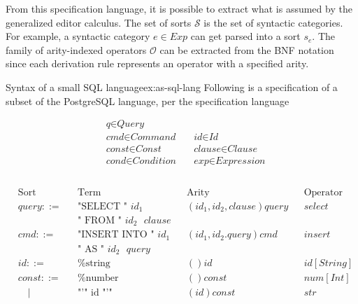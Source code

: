 From this specification language, it is possible to extract what is assumed by the generalized editor calculus\cite{aalborg}. The set of sorts $\mathcal{S}$ is the set of syntactic categories. For example, a syntactic category $e \in Exp$ can get parsed into a sort $s_{e}$.
The family of arity-indexed operators $\mathcal{O}$ can be extracted from the BNF notation since each derivation rule represents an operator with a specified arity.
\begin{example}{Syntax of a small SQL language}{ex:as-sql-lang}
  Following is a specification of a subset of the PostgreSQL\cite{postgresql-about} language, per the specification language


  \[
    \begin{aligned}
       & \textit{q} \in \textit{Query}                                                       \\
       & \textit{cmd} \in \textit{Command}      \quad & \textit{id} \in \textit{Id}          \\
       & \textit{const} \in \textit{Const}      \quad & \textit{clause} \in \textit{Clause}  \\
       & \textit{cond} \in \textit{Condition}   \quad & \textit{exp} \in \textit{Expression} \\
    \end{aligned}
  \]
  \\
  \[
    \begin{aligned}
       & \text{Sort} &  & \text{Term}                     &   & \text{Arity}            &  & \text{Operator} \\
       & query ::=   &  & \text{"SELECT " $id_1$}         &   & (id_1,id_2,clause)query &  & select          \\
       &             &  & \text{" FROM " $id_2$ $clause$}                                                    \\
       & cmd ::=     &  & \text{"INSERT INTO " $id_1$}    &   & (id_1,id_2.query)cmd    &  & insert          \\
       &             &  & \text{" AS " $id_2$ $query$}    &                                                  \\
       & id ::=      &  & \text{\%string}                 &   & ()id                    &  & id[String]      \\
       & const ::=   &  & \text{\%number}                 &   & ()const                 &  & num[Int]        \\
       & \quad |     &  & \text{"'" id "'"}               &   & (id)const               &  & str             \\

\end{aligned}\]
\end{example}
